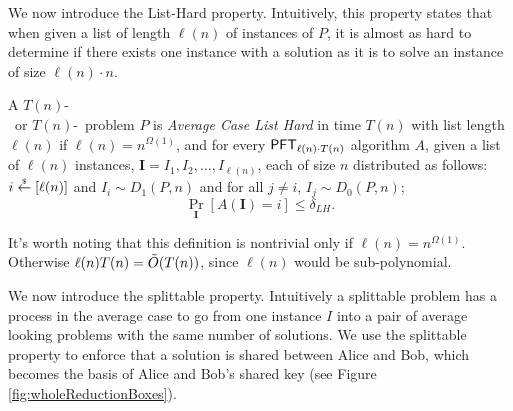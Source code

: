%
We now introduce the List-Hard property. Intuitively, this property states that when given a list of length $\ell(n)$ of instances of $P$, it is almost as hard to determine if there exists one instance with a solution as it is to solve an instance of size $\ell(n) \cdot n$.



\begin{definition}\label{def:aclh}
	A $T(n)$-\\
	\ACIH~or $T(n)$-\ACSH~problem $P$ is \emph{Average Case List Hard} in time $T(n)$ with list length $\ell(n)$ if $\ell(n) = n^{\Omega(1)}$, and for every $\PFT{\ell(n) \cdot T(n)}$ algorithm $A$, given a list of $\ell(n)$ instances, $\mathbf I = I_1,I_2,\ldots,I_{\ell(n)}$, each of size $n$
	distributed as follows: $i \getsr [\ell(n)]$ and $I_i \sim D_1(P,n)$ and for all $j \neq i$, $I_j \sim D_0(P,n)$;
	\[ \Pr_{\mathbf I}[A(\mathbf I) = i] \le \delta_{LH}. \]
\end{definition}

It's worth noting that this definition is nontrivial only if $\ell(n) = n^{\Omega(1)}$. Otherwise $\ell(n) T(n) = \~O(T(n))$, since $\ell(n)$ would be sub-polynomial.


We now introduce the splittable property. Intuitively a splittable problem has a process in the average case to go from one instance $I$ into a pair of average looking problems with the same number of solutions. We use the splittable property to enforce that a solution is shared between Alice and Bob, which becomes the basis of Alice and Bob's shared key (see Figure \ref{fig:wholeReductionBoxes}). 


